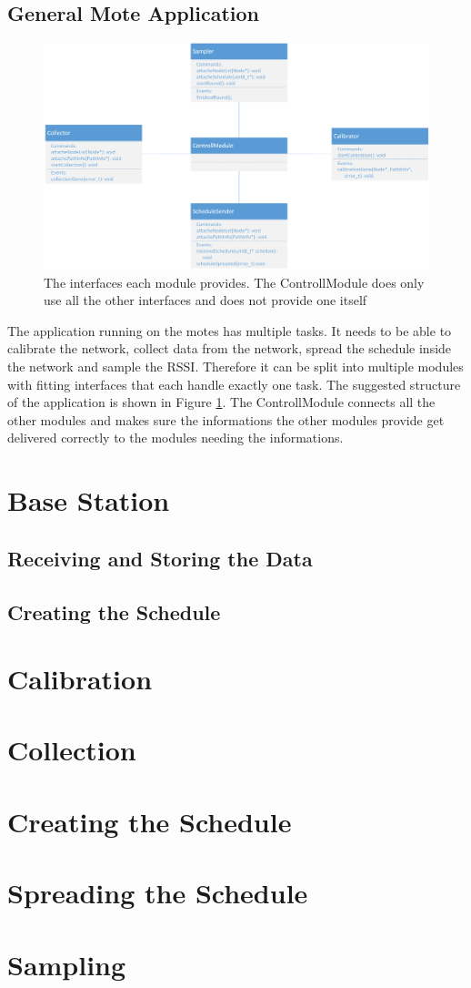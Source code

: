 \subsection{General Mote Application}
\begin{figure}[htbp]
	\centering
    \includegraphics[scale=0.6]{content/images/Motes/GeneralStructure}
   	\caption{The interfaces each module provides. The ControllModule does only use all the other interfaces and does not provide one itself}
    \label{fig:moteStructure}
\end{figure}
The application running on the motes has multiple tasks. It needs to be able to calibrate the network, collect data from the network, spread the schedule inside the network and sample the RSSI. Therefore it can be split into multiple modules with fitting interfaces that each handle exactly one task. The suggested structure of the application is shown in Figure \ref{fig:moteStructure}. The ControllModule connects all the other modules and makes sure the informations the other modules provide get delivered correctly to the modules needing the informations.     

\section{Base Station}
\subsection{Receiving and Storing the Data}

\subsection{Creating the Schedule}
\section{Calibration}
\section{Collection}
\section{Creating the Schedule}
\section{Spreading the Schedule}
\section{Sampling}